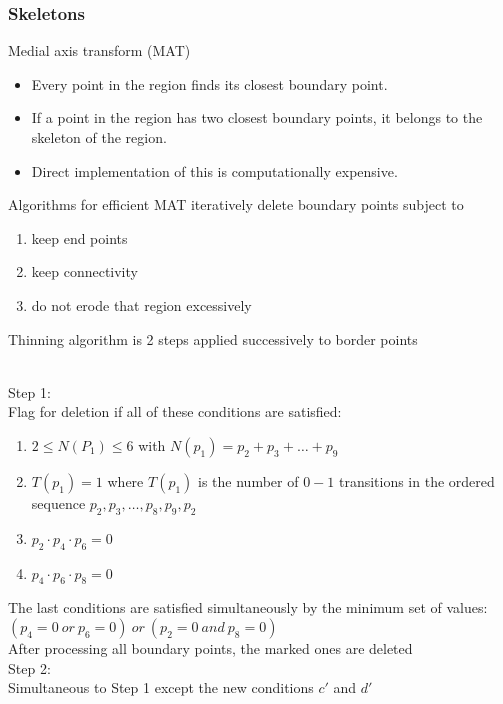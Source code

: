 \subsubsection{Skeletons}
Medial axis transform (MAT)
\begin{itemize}
\item Every point in the region finds its closest boundary point.
\item If a point in the region has two closest boundary points, it belongs to the skeleton of the region.
\item Direct implementation of this is computationally expensive.
\end{itemize}
Algorithms for efficient MAT iteratively delete boundary points subject to
\begin{enumerate}
\item keep end points
\item keep connectivity
\item do not erode that region excessively
\end{enumerate}
Thinning algorithm is 2 steps applied successively to border points\\
\\
Step 1:\\
Flag for deletion if all of these conditions are satisfied:
\begin{enumerate}[label={\alph*)}]
\item $2\leq N(P_1)\leq 6$ with $N(p_1)=p_2 + p_3 + \ldots + p_9$
\item $T(p_1)=1$ where $T(p_1)$ is the number of $0-1$ transitions in the ordered sequence $p_2,p_3,\ldots ,p_8,p_9,p_2$
\item $p_2 \cdot p_4 \cdot p_6 = 0$
\item $p_4 \cdot p_6 \cdot p_8 = 0$
\end{enumerate}
The last conditions are satisfied simultaneously by the minimum set of values: $(p_4=0\ or\ p_6=0)\ or \ (p_2=0\ and \ p_8=0)$\\
After processing all boundary points, the marked ones are deleted\\
Step 2:\\
Simultaneous to Step 1 except the new conditions $c'$ and $d'$\\
